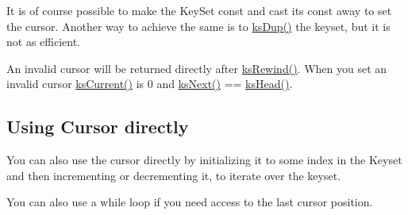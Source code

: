 \begin{DoxyCode}{0}
\DoxyCodeLine{\{}
\DoxyCodeLine{}
\DoxyCodeLine{        \textcolor{comment}{// work with keyset}}
\DoxyCodeLine{}
\DoxyCodeLine{        \textcolor{comment}{// now bring the keyset to the state before}}
\DoxyCodeLine{\}}
\end{DoxyCode}


It is of course possible to make the Key\+Set const and cast its const away to set the cursor. Another way to achieve the same is to \mbox{\hyperlink{group__keyset_gac59e4b328245463f1451f68d5106151c}{ks\+Dup()}} the keyset, but it is not as efficient.

An invalid cursor will be returned directly after \mbox{\hyperlink{group__keyset_gabe793ff51f1728e3429c84a8a9086b70}{ks\+Rewind()}}. When you set an invalid cursor \mbox{\hyperlink{group__keyset_ga4287b9416912c5f2ab9c195cb74fb094}{ks\+Current()}} is 0 and \mbox{\hyperlink{group__keyset_ga317321c9065b5a4b3e33fe1c399bcec9}{ks\+Next()}} == \mbox{\hyperlink{group__keyset_gae7dbf3aef70e67b5328475eb3d1f92f5}{ks\+Head()}}.\hypertarget{group__keyset_cursor_directly}{}\subsection{Using Cursor directly}\label{group__keyset_cursor_directly}
You can also use the cursor directly by initializing it to some index in the Keyset and then incrementing or decrementing it, to iterate over the keyset.


\begin{DoxyCodeInclude}{0}
\DoxyCodeLine{        \{}
\DoxyCodeLine{        \}}
\end{DoxyCodeInclude}


You can also use a while loop if you need access to the last cursor position.


